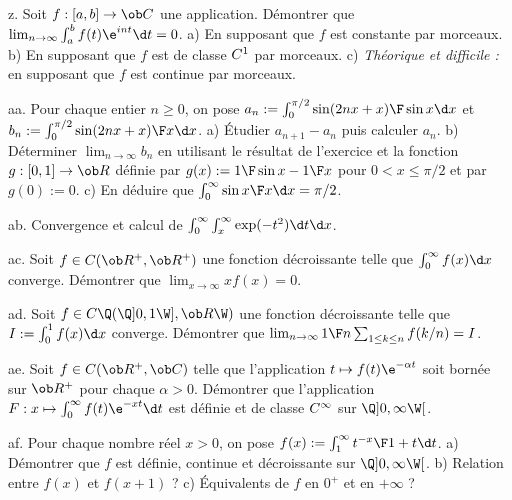 \exo [Level=1,Fight=3,Learn=2,Field=\Intégration,Type=\Exercices,Origin=\MP] z. 
Soit $f:[a,b]\to\ob C$ une application. Démontrer que $\lim_{n\to\infty}\int_a^bf(t)\e^{int}\d t=0$. \pn
a) En supposant que $f$ est constante par morceaux. \pn
b) En supposant que $f$ est de classe $\sc C^1$ par morceaux. \pn
c) {\it Théorique et difficile : }en supposant que $f$ est continue par morceaux.  

\exo [Level=2,Fight=3,Learn=3,Field=\IntégralesGénéralisées,Type=\TravauxDirigés,Origin=] aa. 
Pour chaque entier $n\ge0$, on pose $a_n:=\int_0^{\pi/2}{\sin(2nx+x)\F\sin x }\d x$ et 
$b_n:=\int_0^{\pi/2}{\sin(2nx+x)\F x }\d x$. \pn
a) \'Etudier $a_{n+1}-a_n$ puis calculer $a_n$. \pn
b) Déterminer $\lim_{n\to\infty}b_n$ 
en utilisant le résultat de l'exercice  et la fonction $g:[0,1]\to\ob R$ 
définie par $g(x):={1\F\sin x}-{1\F x}$ pour $0<x\le \pi/2$ et par $g(0):=0$. \pn
c) En déduire que $\int_0^\infty{\sin x\F x}\d x={\pi/2}$. 

\exo [Level=2,Fight=1,Learn=1,Field=\IntégralesGénéralisées,Type=\Exercices,Origin=] ab. 
Convergence et calcul de $\int_0^\infty\int_x^\infty\exp(-t^2)\d t\d x$. 

\exo [Level=2,Fight=3,Learn=1,Field=\IntégralesGénéralisées,Type=\Colles,Origin=\MP] ac. 
Soit $f\in\sc C(\ob R^+,\ob R^+)$ une fonction décroissante telle que $\int_0^\infty f(x)\d x$ converge. \pn
Démontrer que $\lim_{x\to\infty}xf(x)=0$. 

\exo [Level=2,Fight=3,Learn=2,Field=\IntégralesGénéralisées,Type=\Colles,Origin=\MP] ad. 
Soit $f\in\sc C\Q(\Q]0,1\W],\ob R\W)$ une fonction décroissante 
telle que $I:=\int_0^1 f(x)\d x$ converge. \pn
Démontrer que $\lim_{n\to\infty}{1\F n}\sum_{1\le k\le n}f(k/n)=I$. 

\exo [Level=2,Fight=1,Learn=1,Field=\FonctionsDéfiniesParUneIntégrale,Type=\Cours,Origin=\MP] ae. 
Soit $f\in\sc C(\ob R^+,\ob C)$ telle que l'application $t\mapsto f(t)\e^{-\alpha t}$ 
soit bornée sur $\ob R^+$ pour chaque $\alpha>0$. \pn
Démontrer que l'application $F:x\mapsto\int_0^\infty f(t)\e^{-xt}\d t$ 
est définie et de classe $\sc C^\infty$ sur $\Q]0,\infty\W[$. 

\exo [Level=2,Fight=2,Learn=2,Field=\FonctionsDéfiniesParUneIntégrale,Type=\Exercices,Origin=\MP] af. 
Pour chaque nombre réel $x>0$, on pose $f(x):=\int_1^\infty{t^{-x}\F 1+t}\d t$. \pn
a) Démontrer que $f$ est définie, continue et décroissante sur $\Q]0,\infty\W[$. \pn
b) Relation entre $f(x)$ et $f(x+1)$ ? \pn
c) \'Equivalents de $f$ en $0^+$ et en $+\infty$ ?


